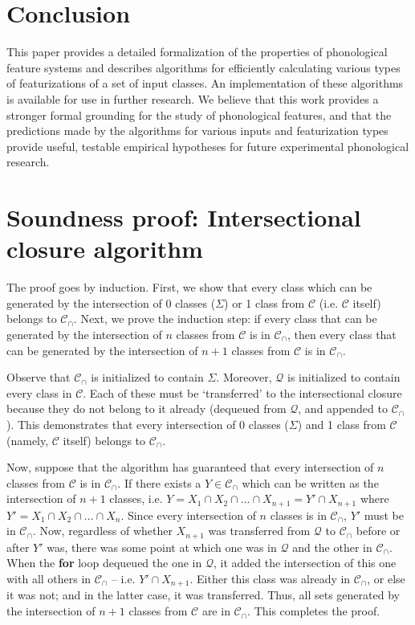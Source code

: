 \documentclass[11pt, oneside]{article}   	%
\begin{document}
\FloatBarrier
\section{Conclusion}
\label{sec:conclusion}

This paper provides a detailed formalization of the properties of phonological feature systems and describes algorithms for efficiently calculating various types of featurizations of a set of input classes. An implementation of these algorithms is available for use in further research. We believe that this work provides a stronger formal grounding for the study of phonological features, and that the predictions made by the algorithms for various inputs and featurization types provide useful, testable empirical hypotheses for future experimental phonological research.

\appendix

\section{Soundness proof: Intersectional closure algorithm}
\label{app:intersectionproof}

The proof goes by induction. First, we show that every class which can be generated by the intersection of $0$ classes ($\Sigma$) or 1 class from $\mathcal C$ (i.e. $\mathcal C$ itself) belongs to $\mathcal C_\cap$. Next, we prove the induction step: if every class that can be generated by the intersection of $n$ classes from $\mathcal C$ is in $\mathcal C_\cap$, then every class that can be generated by the intersection of $n+1$ classes from $\mathcal C$ is in $\mathcal C_\cap$.

Observe that $\mathcal C_\cap$ is initialized to contain $\Sigma$. Moreover, $\mathcal Q$ is initialized to contain every class in $\mathcal C$. Each of these must be `transferred' to the intersectional closure because they do not belong to it already (dequeued from $\mathcal Q$, and appended to $\mathcal C_\cap$). This demonstrates that every intersection of 0 classes ($\Sigma$) and 1 class from $\mathcal C$ (namely, $\mathcal C$ itself) belongs to $\mathcal C_\cap$.

Now, suppose that the algorithm has guaranteed that every intersection of $n$ classes from $\mathcal C$ is in $\mathcal C_\cap$. If there exists a $Y \in \mathcal C_\cap$ which can be written as the intersection of $n+1$ classes, i.e. $Y = X_1 \cap X_2 \cap \ldots \cap X_{n+1} = Y' \cap X_{n+1}$ where $Y' = X_1 \cap X_2 \cap \ldots \cap X_n$. Since every intersection of $n$ classes is in $\mathcal C_\cap$, $Y'$ must be in $\mathcal C_\cap$. Now, regardless of whether $X_{n+1}$ was transferred from $\mathcal Q$ to $\mathcal C_\cap$ before or after $Y'$ was, there was some point at which one was in $\mathcal Q$ and the other in $\mathcal C_\cap$. When the \textbf{for} loop dequeued the one in $\mathcal Q$, it added the intersection of this one with all others in $\mathcal C_\cap$ -- i.e. $Y' \cap X_{n+1}$. Either this class was already in $\mathcal C_\cap$, or else it was not; and in the latter case, it was transferred. Thus, all sets generated by the intersection of $n+1$ classes from $\mathcal C$ are in $\mathcal C_\cap$. This completes the proof.
\end{document}
